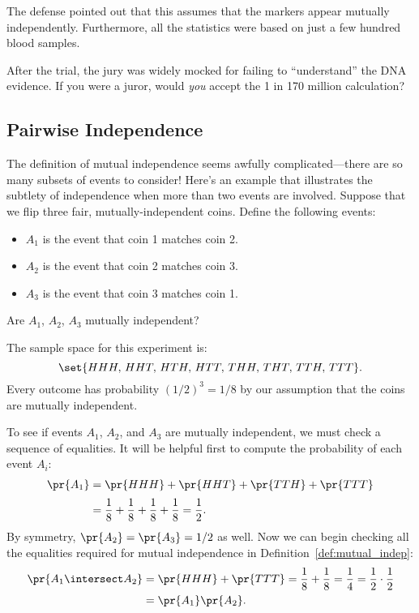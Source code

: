 \iffalse
\begin{align*}
\pr{A \intersect B \intersect C \intersect D \intersect E}
    & = \pr{A} \cdot \pr{B} \cdot \pr{C} \cdot \pr{D} \cdot \pr{E} \\[2pt]
    & = \frac{1}{100} \cdot \frac{1}{50} \cdot \frac{1}{40}
                      \cdot \frac{1}{5} \cdot \frac{1}{170} \\[2pt]
    & = \frac{1}{170{,}000{,}000}.
\end{align*}
\fi
%
The defense pointed out that this assumes that the markers appear
mutually independently.  Furthermore, all the statistics were based on
just a few hundred blood samples.  

After the trial, the jury was widely mocked for failing to
``understand'' the DNA evidence.  If you were a juror, would
\emph{you} accept the 1 in 170 million calculation?

\subsection{Pairwise Independence}

The definition of mutual independence seems awfully
complicated---there are so many subsets of events to consider!  Here's
an example that illustrates the subtlety of independence when more
than two events are involved.
Suppose that we flip three fair, mutually-independent coins.  Define
the following events:
%
\begin{itemize}
\item $A_1$ is the event that coin 1 matches coin 2.
\item $A_2$ is the event that coin 2 matches coin 3.
\item $A_3$ is the event that coin 3 matches coin 1.
\end{itemize}
%
Are $A_1$, $A_2$, $A_3$ mutually independent?

The sample space for this experiment is:
%
\[
    \set{HHH,\, HHT,\, HTH,\, HTT,\, THH,\, THT,\, TTH,\, TTT}.
\]
%
Every outcome has probability $(1/2)^3 = 1/8$ by our assumption that
the coins are mutually independent.

To see if events $A_1$, $A_2$, and $A_3$ are mutually independent, we
must check a sequence of equalities.  It will be helpful first to
compute the probability of each event $A_i$:
%
\begin{align*}
\pr{A_1} & = \pr{HHH} + \pr{HHT} + \pr{TTH} + \pr{TTT} \\[2pt]
         & = \frac{1}{8} + \frac{1}{8} + \frac{1}{8} + \frac{1}{8}%
          = \frac{1}{2}.
\end{align*}
%
By symmetry, $\pr{A_2} = \pr{A_3} = 1/2$ as well.  Now we can begin
checking all the equalities required for mutual independence in
Definition~\ref{def:mutual_indep}:
\begin{align*}
\pr{A_1 \intersect A_2}
       & = \pr{HHH} + \pr{TTT}
         = \frac{1}{8} + \frac{1}{8}
         = \frac{1}{4}
         = \frac{1}{2} \cdot \frac{1}{2}\\
       & = \pr{A_1} \pr{A_2}.
\end{align*}

